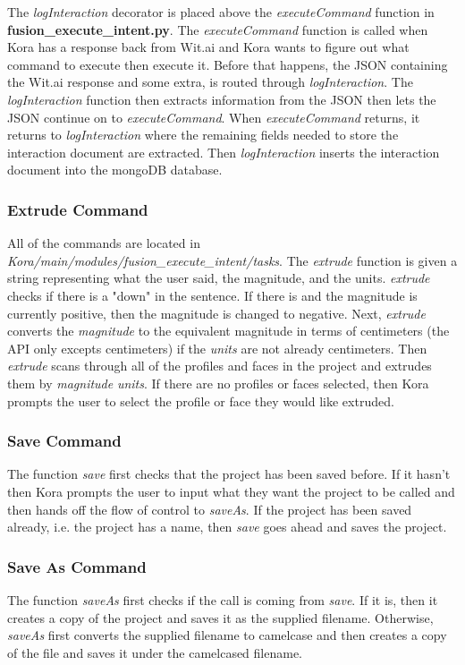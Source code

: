 \documentclass[onecolumn, draftclsnofoot,10pt, compsoc]{IEEEtran}
\begin{document}
The \textit{logInteraction} decorator is placed above the \textit{executeCommand} function in \textbf{fusion\_execute\_intent.py}. The \textit{executeCommand} function is called when Kora has a response back from Wit.ai and Kora wants to figure out what command to execute then execute it. Before that happens, the JSON containing the Wit.ai response and some extra, is routed through \textit{logInteraction}. The \textit{logInteraction} function then extracts information from the JSON then lets the JSON continue on to \textit{executeCommand}. When \textit{executeCommand} returns, it returns to \textit{logInteraction} where the remaining fields needed to store the interaction document are extracted.
Then \textit{logInteraction} inserts the interaction document into the mongoDB database.

\subsubsection{Extrude Command}
All of the commands are located in \textit{Kora/main/modules/fusion\_execute\_intent/tasks}. The \textit{extrude} function is given a string representing what the user said, the magnitude, and the units.
\textit{extrude} checks if there is a "down" in the sentence. If there is and the magnitude is currently positive, then the magnitude is changed to negative. Next, \textit{extrude} converts the \textit{magnitude} to the equivalent magnitude in terms of centimeters (the API only excepts centimeters) if the \textit{units} are not already centimeters.
Then \textit{extrude} scans through all of the profiles and faces in the project and extrudes them by \textit{magnitude} \textit{units}. If there are no profiles or faces selected, then Kora prompts the user to select the profile or face they would like extruded.

\subsubsection{Save Command} 
The function \textit{save} first checks that the project has been saved before. If it hasn't then Kora prompts the user to input what they want the project to be called and then hands off the flow of control to \textit{saveAs}. If the project has been saved already, i.e. the project has a name, then \textit{save} goes ahead and saves the project.

\subsubsection{Save As Command}
The function \textit{saveAs} first checks if the call is coming from \textit{save}. If it is, then it creates a copy of the project and saves it as the supplied filename. Otherwise, \textit{saveAs} first converts the supplied filename to camelcase and then creates a copy of the file and saves it under the camelcased filename.
\end{document}
